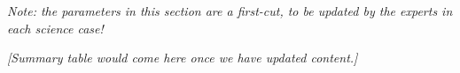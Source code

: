 {\it Note: the parameters in this section are a first-cut, to be
  updated by the experts in each science case!}

{\it [Summary table would come here once we have updated content.]}










